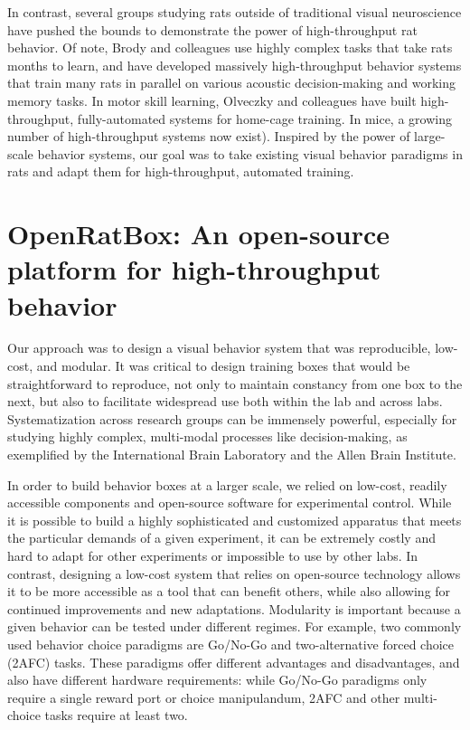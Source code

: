 In contrast, several groups studying rats outside of traditional visual neuroscience have pushed the bounds to demonstrate the power of high-throughput rat behavior. Of note, Brody and colleagues use highly complex tasks that take rats months to learn, and have developed massively high-throughput behavior systems that train many rats in parallel on various acoustic decision-making and working memory tasks\cite{Miller2017TwoStep, Brunton2013RatsFrom}. In motor skill learning, Olveczky and colleagues have built high-throughput, fully-automated systems for home-cage training\cite{Poddar2013}. In mice, a growing number of high-throughput systems now exist\cite{Qiao2018}). Inspired by the power of large-scale behavior systems, our goal was to take existing visual behavior paradigms in rats and adapt them for high-throughput, automated training. 



\section{OpenRatBox: An open-source platform for high-throughput behavior}
Our approach was to design a visual behavior system that was reproducible, low-cost, and modular. It was critical to design training boxes that would be straightforward to reproduce, not only to maintain constancy from one box to the next, but also to facilitate widespread use both within the lab and across labs. Systematization across research groups can be immensely powerful, especially for studying highly complex, multi-modal processes like decision-making, as exemplified by the International Brain Laboratory\cite{IBL} and the Allen Brain Institute\cite{REFREF}.

In order to build behavior boxes at a larger scale, we relied on low-cost, readily accessible components and open-source software for experimental control. While it is possible to build a highly sophisticated and customized apparatus that meets the particular demands of a given experiment, it can be extremely costly and hard to adapt for other experiments or impossible to use by other labs. In contrast, designing a low-cost system that relies on open-source technology allows it to be more accessible as a tool that can benefit others, while also allowing for continued improvements and new adaptations. Modularity is important because a given behavior can be tested under different regimes. For example, two commonly used behavior choice paradigms are Go/No-Go and two-alternative forced choice (2AFC) tasks. These paradigms offer different advantages and disadvantages, and also have different hardware requirements: while Go/No-Go paradigms only require a single reward port or choice manipulandum, 2AFC and other multi-choice tasks require at least two. 

